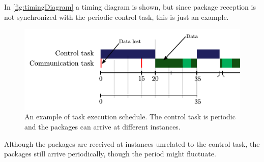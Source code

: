 In \autoref{fig:timingDiagram} a timing diagram is shown, but since package reception is not synchronized with the periodic control task, this is just an example.

\begin{figure}[H]
    \includegraphics[width =.7\textwidth]{figures/timingDiagram}
    \centering			
    \caption{An example of task execution schedule. The control task is periodic and the packages can arrive at different instances.} 
    \label{fig:timingDiagram}
\end{figure}

Although the packages are received at instances unrelated to the control task, the packages still arrive periodically, though the period might fluctuate.